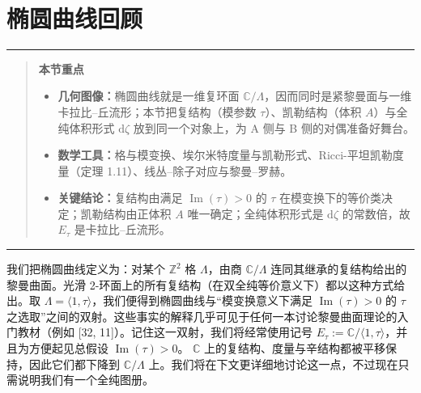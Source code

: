 \documentclass[11pt,a4paper]{article}
\theoremstyle{plain}
\theoremstyle{definition}
\newenvironment{keytakeaways}[1][本节重点]{%
  \par\addvspace{9pt}%
  \noindent\rule{\linewidth}{0.7pt}\par\nobreak
  \begin{quote}\noindent\textbf{#1}\par\small
}{%
  \end{quote}%
  \noindent\rule{\linewidth}{0.7pt}\par\addvspace{7pt}%
}
\begin{document}

﻿\section{椭圆曲线回顾}

\begin{keytakeaways}
\begin{itemize}
  \item \textbf{几何图像：}椭圆曲线就是一维复环面 $\mathbb{C}/\Lambda$，因而同时是紧黎曼面与一维卡拉比–丘流形；本节把复结构（模参数 $\tau$）、凯勒结构（体积 $A$）与全纯体积形式 $\mathrm{d}\zeta$ 放到同一个对象上，为 A 侧与 B 侧的对偶准备好舞台。
  \item \textbf{数学工具：}格与模变换、埃尔米特度量与凯勒形式、Ricci-平坦凯勒度量（定理 1.11）、线丛–除子对应与黎曼–罗赫。
  \item \textbf{关键结论：}复结构由满足 $\operatorname{Im}(\tau)>0$ 的 $\tau$ 在模变换下的等价类决定；凯勒结构由正体积 $A$ 唯一确定；全纯体积形式是 $\mathrm{d}\zeta$ 的常数倍，故 $E_\tau$ 是卡拉比–丘流形。
\end{itemize}
\end{keytakeaways}

我们把椭圆曲线定义为：对某个 $\mathbb{Z}^2$ 格 $\Lambda$，由商 $\mathbb{C}/\Lambda$ 连同其继承的复结构给出的黎曼曲面。光滑 2-环面上的所有复结构（在双全纯等价意义下）都以这种方式给出。取 $\Lambda=\langle 1,\tau\rangle$，我们便得到椭圆曲线与“模变换意义下满足 $\operatorname{Im}(\tau)>0$ 的 $\tau$ 之选取”之间的双射。这些事实的解释几乎可见于任何一本讨论黎曼曲面理论的入门教材（例如 [32, 11]）。记住这一双射，我们将经常使用记号 $E_\tau:=\mathbb{C}/\langle 1,\tau\rangle$，并且为方便起见总假设 $\operatorname{Im}(\tau)>0$。
$\mathbb{C}$ 上的复结构、度量与辛结构都被平移保持，因此它们都下降到 $\mathbb{C}/\Lambda$ 上。我们将在下文更详细地讨论这一点，不过现在只需说明我们有一个全纯图册。
\end{document}
